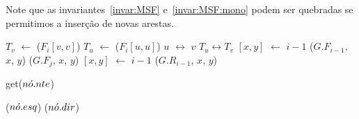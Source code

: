 Note que as invariantes~\ref{invar:MSF} e~\ref{invar:MSF:mono} podem ser quebradas se permitimos a inserção de novas arestas.

\begin{algorithm}
\caption{\dymGraphReplaceMSF($G$, $u$, $v$, $niv$)}
\label{Algo:dymGraphReplaceMSF}
\begin{algorithmic}[1]
\label{Algo:dymGraphReplace:linha:primeira}
\State $T_v$ $\gets$  \treapGetRoot($F_i[v,v]$)
\State $T_u$ $\gets$  \treapGetRoot($F_i[u,u]$)
\State $u$ $\leftrightarrow$ $v$
\State $T_u \leftrightarrow T_v$
\EndIf
{}\label{Algo:dymGraphReplace:linha:moveTu}
\State \nivel$[x,y]$ $\gets$ $i-1$
\State \dymForestAddEdge($G$.$F_{i-1}$, $x$, $y$) 
\EndFor
{}
\label{Algo:dymGraphReplace:linha:inseresub}
\State \dymForestAddEdge($G$.$F_j$, $x$, $y$)
\EndFor
\State \Return
\Else
\State \nivel$[x,y]$ $\gets$ $i-1$
\State \graphAdd($G$.$R_{i-1}$, $x$, $y$)
\EndIf
\EndWhile
\EndFor\label{Algo:dymGraphReplace:linha:ultima}
\end{algorithmic}
\end{algorithm}


\begin{algorithm}
\caption{\treapGetEdgeMinWeight($\node$)}
\label{Algo:treapGetEdgeMinWeight}
\begin{algorithmic}[1]
\State \Return \Nil
\EndIf
{}
	\State  \Return get($n\acute{o}.nte$)
	\State [...] 
\EndIf

\State  \Return \treapGetEdgeMinWeight($n\acute{o}.esq$)
\EndIf
\State \Return \treapGetEdgeMinWeight($n\acute{o}.dir$)

\end{algorithmic}
\end{algorithm}
